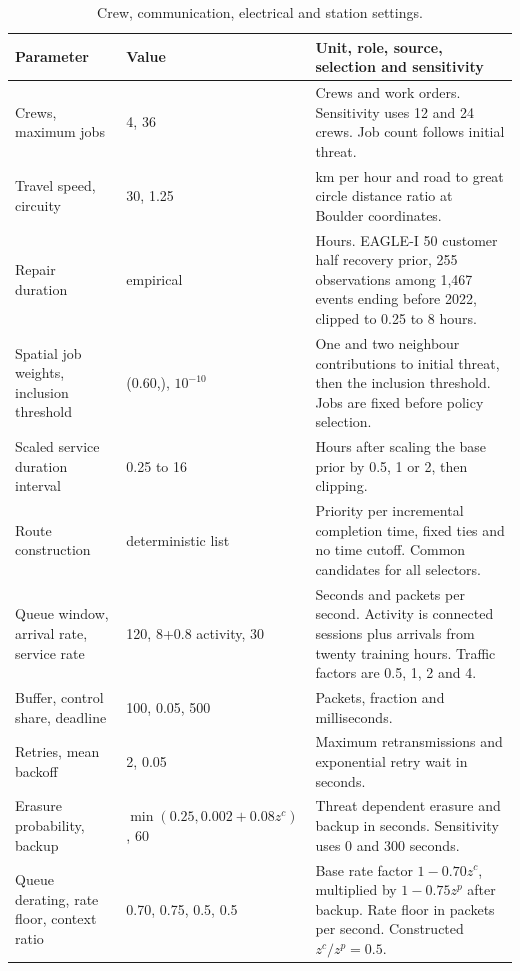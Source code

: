 \begin{table}[p]
\centering
\caption{Crew, communication, electrical and station settings.}
\label{tab:execution-parameters}
\footnotesize\setlength{\tabcolsep}{4pt}\renewcommand{\arraystretch}{1.0}
\begin{tabular}{@{}p{}p{}p{}@{}}
\toprule Parameter & Value & Unit, role, source, selection and sensitivity \\ \midrule
Crews, maximum jobs & 4, 36 & Crews and work orders. Sensitivity uses 12 and 24 crews. Job count follows initial threat. \\
Travel speed, circuity & 30, 1.25 & km per hour and road to great circle distance ratio at Boulder coordinates. \\
Repair duration & empirical & Hours. EAGLE-I 50 customer half recovery prior, 255 observations among 1,467 events ending before 2022, clipped to 0.25 to 8 hours. \\
Spatial job weights, inclusion threshold & (0.60,\allowbreak 0.30), $10^{-10}$ & One and two neighbour contributions to initial threat, then the inclusion threshold. Jobs are fixed before policy selection. \\
Scaled service duration interval & 0.25 to 16 & Hours after scaling the base prior by 0.5, 1 or 2, then clipping. \\
Route construction & deterministic list & Priority per incremental completion time, fixed ties and no time cutoff. Common candidates for all selectors. \\
Queue window, arrival rate, service rate & 120, 8+\allowbreak{}0.8 activity, 30 & Seconds and packets per second. Activity is connected sessions plus arrivals from twenty training hours. Traffic factors are 0.5, 1, 2 and 4. \\
Buffer, control share, deadline & 100, 0.05, 500 & Packets, fraction and milliseconds. \\
Retries, mean backoff & 2, 0.05 & Maximum retransmissions and exponential retry wait in seconds. \\
Erasure probability, backup & $\min(0.25,\allowbreak 0.002+\allowbreak 0.08z^c)$, 60 & Threat dependent erasure and backup in seconds. Sensitivity uses 0 and 300 seconds. \\
Queue derating, rate floor, context ratio & 0.70, 0.75, 0.5, 0.5 & Base rate factor $1-0.70z^c$, multiplied by $1-0.75z^p$ after backup. Rate floor in packets per second. Constructed $z^c/z^p=0.5$. \\

\end{tabular}
\end{table}
